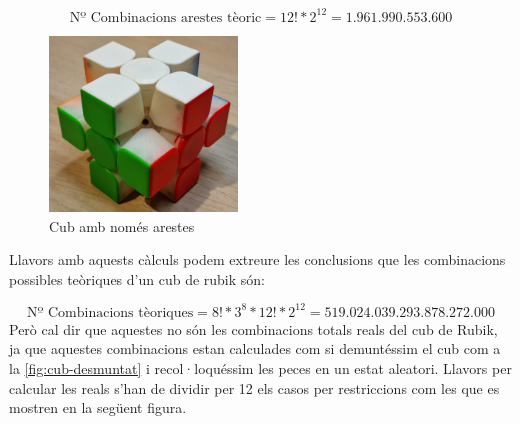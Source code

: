 $$ \textrm{Nº Combinacions arestes tèoric} = 12!*2^12 = 1.961.990.553.600$$

\begin{figure}[h!]
    \centering
    \includegraphics[width=5cm]{img/figures/only-edges.jpg}
    \caption{Cub amb només arestes}
    \label{fig:only-edges}
\end{figure} 

Llavors amb aquests càlculs podem extreure les conclusions que les combinacions possibles teòriques d'un cub de rubik són:

$$ \textrm{Nº Combinacions tèoriques} = 8!*3^8*12!*2^{12}= 519.024.039.293.878.272.000 $$
Però cal dir que aquestes no són les combinacions totals reals del cub de Rubik, ja que aquestes combinacions estan calculades com si demuntéssim el cub com a la \ref{fig:cub-desmuntat} i recol·loquéssim les peces en un estat aleatori.
Llavors per calcular les reals s'han de dividir per 12 els casos per restriccions com les que es mostren en la següent figura.


